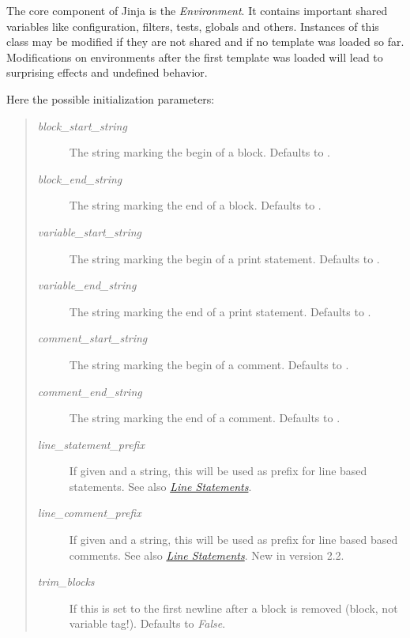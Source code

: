 \documentclass[a4paper,10pt,english]{sphinxmanual}
\begin{document}
\begin{fulllineitems}
\label{api:jinja2.Environment}
The core component of Jinja is the \emph{Environment}.  It contains
important shared variables like configuration, filters, tests,
globals and others.  Instances of this class may be modified if
they are not shared and if no template was loaded so far.
Modifications on environments after the first template was loaded
will lead to surprising effects and undefined behavior.

Here the possible initialization parameters:
\begin{quote}
\begin{description}
\item[{\emph{block\_start\_string}}] \leavevmode
The string marking the begin of a block.  Defaults to .

\item[{\emph{block\_end\_string}}] \leavevmode
The string marking the end of a block.  Defaults to .

\item[{\emph{variable\_start\_string}}] \leavevmode
The string marking the begin of a print statement.
Defaults to .

\item[{\emph{variable\_end\_string}}] \leavevmode
The string marking the end of a print statement.  Defaults to
.

\item[{\emph{comment\_start\_string}}] \leavevmode
The string marking the begin of a comment.  Defaults to .

\item[{\emph{comment\_end\_string}}] \leavevmode
The string marking the end of a comment.  Defaults to .

\item[{\emph{line\_statement\_prefix}}] \leavevmode
If given and a string, this will be used as prefix for line based
statements.  See also {\hyperref[templates:line-statements]{\emph{Line Statements}}}.

\item[{\emph{line\_comment\_prefix}}] \leavevmode
If given and a string, this will be used as prefix for line based
based comments.  See also {\hyperref[templates:line-statements]{\emph{Line Statements}}}.
New in version 2.2.
\item[{\emph{trim\_blocks}}] \leavevmode
If this is set to  the first newline after a block is
removed (block, not variable tag!).  Defaults to \emph{False}.


\end{description}
\end{quote}
\end{fulllineitems}
\end{document}
